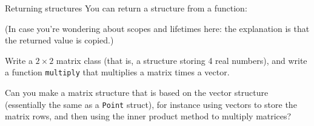 \begin{block}{Returning structures}
  \label{sl:struct-return}
  You can return a structure from a function:

  (In case you're wondering about scopes and lifetimes here: the
  explanation is that the returned value is copied.)
\end{block}

\begin{exercise}
  \label{ex:matstruct}
  Write a $2\times 2$ matrix class (that is, a structure storing 4
  real numbers), and write a function \lstinline$multiply$
  that multiplies a matrix times a vector.

  Can you make a matrix structure that is based on the vector
  structure
  (essentially the same as a \lstinline{Point} struct),
  for instance using vectors to store the matrix rows, and
  then using the inner product method to multiply matrices?
\end{exercise}

